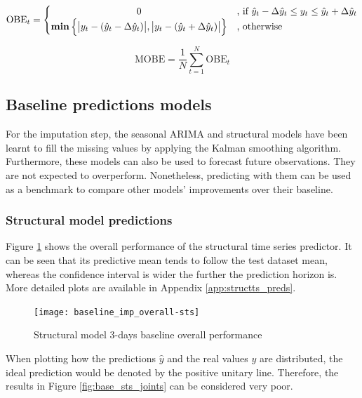 \begin{equation}
	\text{OBE}_t = 
	\begin{cases}
		\hfil 0  & \text{, if } \hat{y}_t - \Delta\hat{y}_t \leq y_t \leq \hat{y}_t + \Delta\hat{y}_t \\
		\bm{\min} \Big\{ \big| y_t - (\hat{y}_t - \Delta\hat{y}_t) \big| , \big	| y_t - (\hat{y}_t + \Delta\hat{y}_t) \big| \Big\} & \text{, otherwise}\\
	\end{cases}\label{eq:obe} 
\end{equation}
	
\begin{equation}
	\label{eq:mobe}
	\text{MOBE} = \frac{1}{N} \sum_{t=1}^{N}{ \text{OBE}_t }
\end{equation}

\subsection{Baseline predictions models}

For the imputation step, the seasonal ARIMA and structural models have been learnt to fill the missing values by applying the Kalman smoothing algorithm. Furthermore, these models can also be used to forecast future observations. They are not expected to overperform. Nonetheless, predicting with them can be used as a benchmark to compare other models' improvements over their baseline.  

\subsubsection*{Structural model predictions}
\label{subsubsec:structts_preds}

Figure \ref{fig:base_sts_overall} shows the overall performance of the structural time series predictor. It can be seen that its predictive mean tends to follow the test dataset mean, whereas the confidence interval is wider the further the prediction horizon is. More detailed plots are available in Appendix \ref{app:structts_preds}.

\begin{figure}[H]
	\centering
	\texttt{[image: baseline\_imp\_overall-sts]}
	\caption{Structural model 3-days baseline overall performance}
	\label{fig:base_sts_overall}
\end{figure}

When plotting how the predictions $\hat{y}$ and the real values $y$ are distributed, the ideal prediction would be denoted by the positive unitary line. Therefore, the results in Figure \ref{fig:base_sts_joints} can be considered very poor.

